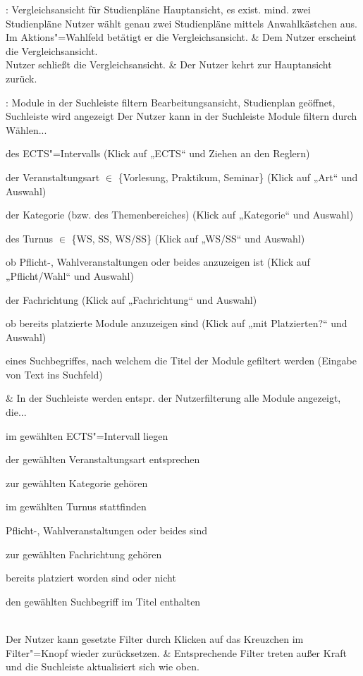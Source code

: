 \begin{usecase}{: Vergleichsansicht für Studienpläne}
	{Hauptansicht, es exist. mind. zwei Studienpläne}
	Nutzer wählt genau zwei Studienpläne mittels Anwahlkästchen aus. Im Aktions"=Wahlfeld betätigt er die Vergleichsansicht.
	& Dem Nutzer erscheint die Vergleichsansicht. \\
	\hline
	Nutzer schließt die Vergleichsansicht. 
	& Der Nutzer kehrt zur Hauptansicht zurück.
\end{usecase}

\begin{usecase}{: Module in der Suchleiste filtern}
	{Bearbeitungsansicht, Studienplan geöffnet, Suchleiste wird angezeigt}
	Der Nutzer kann in der Suchleiste Module filtern durch Wählen...
	\begin{tblitemize}
		\item des ECTS"=Intervalls (Klick auf „ECTS“ und Ziehen an den Reglern)
		\item der Veranstaltungsart $\in$ \{Vorlesung, Praktikum, Seminar\} (Klick auf „Art“ und Auswahl)
		\item der Kategorie (bzw. des Themenbereiches) (Klick auf „Kategorie“ und Auswahl)
		\item des Turnus $\in$ \{WS, SS, WS/SS\} (Klick auf „WS/SS“ und Auswahl)
		\item ob Pflicht-, Wahlveranstaltungen oder beides anzuzeigen ist (Klick auf „Pflicht/Wahl“ und Auswahl)
		\item der Fachrichtung (Klick auf „Fachrichtung“ und Auswahl)
		\item ob bereits platzierte Module anzuzeigen sind (Klick auf „mit Platzierten?“ und Auswahl)
		\item eines Suchbegriffes, nach welchem die Titel der Module gefiltert werden (Eingabe von Text ins Suchfeld)
	\end{tblitemize}
	& In der Suchleiste werden entspr. der Nutzerfilterung alle Module angezeigt, die...
	\begin{tblitemize}
		\item im gewählten ECTS"=Intervall liegen
		\item der gewählten Veranstaltungsart entsprechen
		\item zur gewählten Kategorie gehören
		\item im gewählten Turnus stattfinden
		\item Pflicht-, Wahlveranstaltungen oder beides sind
		\item zur gewählten Fachrichtung gehören
		\item bereits platziert worden sind oder nicht
		\item den gewählten Suchbegriff im Titel enthalten
	\end{tblitemize} \\
	\hline
	Der Nutzer kann gesetzte Filter durch Klicken auf das Kreuzchen im Filter"=Knopf wieder zurücksetzen.
	& Entsprechende Filter treten außer Kraft und die Suchleiste aktualisiert sich wie oben.
\end{usecase}

